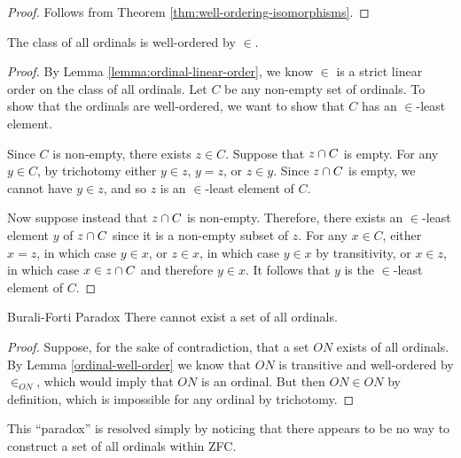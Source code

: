\begin{proof}
    Follows from Theorem \ref{thm:well-ordering-isomorphisms}.
\end{proof}

\begin{lemma}\label{lemma:ordinal-well-order}
    The class of all ordinals is well-ordered by $\in$.
\end{lemma}

\begin{proof}
    By Lemma \ref{lemma:ordinal-linear-order}, we know $\in$ is a strict linear order on the class of all ordinals. Let $C$ be any non-empty set of ordinals. To show that the ordinals are well-ordered, we want to show that $C$ has an $\in$-least element.

    Since $C$ is non-empty, there exists $z \in C$. Suppose that $z \cap C$ is empty. For any $y \in C$, by trichotomy either $y \in z$, $y = z$, or $z \in y$. Since $z \cap C$ is empty, we cannot have $y \in z$, and so $z$ is an $\in$-least element of $C$.

    Now suppose instead that $z \cap C$ is non-empty. Therefore, there exists an $\in$-least element $y$ of $z \cap C$ since it is a non-empty subset of $z$. For any $x \in C$, either $x = z$, in which case $y \in x$, or $z \in x$, in which case $y \in x$ by transitivity, or $x \in z$, in which case $x \in z \cap C$ and therefore $y \in x$. It follows that $y$ is the $\in$-least element of $C$.
\end{proof}

\begin{thm}{Burali-Forti Paradox}\label{burali-forti}\proofbreak
    There cannot exist a set of all ordinals.
\end{thm}

\begin{proof}
    Suppose, for the sake of contradiction, that a set $ON$ exists of all ordinals. By Lemma \ref{ordinal-well-order} we know that $ON$ is transitive and well-ordered by $\in_{ON}$, which would imply that $ON$ is an ordinal. But then $ON \in ON$ by definition, which is impossible for any ordinal by trichotomy.
\end{proof}

\begin{rmk}
    This ``paradox'' is resolved simply by noticing that there appears to be no way to construct a set of all ordinals within ZFC.
\end{rmk}

